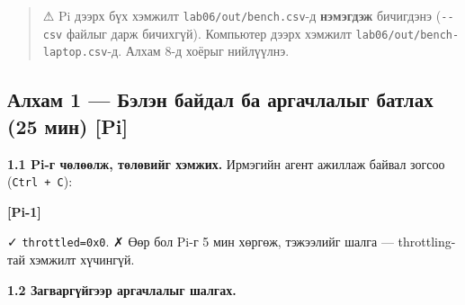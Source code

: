 \begin{quote}
⚠ Pi дээрх бүх хэмжилт \texttt{lab06/\allowbreak{}out/\allowbreak{}bench.\allowbreak{}csv}-д \textbf{нэмэгдэж} бичигдэнэ (\texttt{-\/-csv} файлыг дарж бичихгүй). Компьютер дээрх хэмжилт \texttt{lab06/\allowbreak{}out/\allowbreak{}bench-laptop.\allowbreak{}csv}-д. Алхам 8-д хоёрыг нийлүүлнэ.
\end{quote}

\hypertarget{ux430ux43bux445ux430ux43c-1-ux431ux44dux43bux44dux43d-ux431ux430ux439ux434ux430ux43b-ux431ux430-ux430ux440ux433ux430ux447ux43bux430ux43bux44bux433-ux431ux430ux442ux43bux430ux445-25-ux43cux438ux43d-pi}{%
\subsection{Алхам 1 --- Бэлэн байдал ба аргачлалыг батлах (25 мин) {[}Pi{]}}\label{ux430ux43bux445ux430ux43c-1-ux431ux44dux43bux44dux43d-ux431ux430ux439ux434ux430ux43b-ux431ux430-ux430ux440ux433ux430ux447ux43bux430ux43bux44bux433-ux431ux430ux442ux43bux430ux445-25-ux43cux438ux43d-pi}}

\textbf{1.1 Pi-г чөлөөлж, төлөвийг хэмжих.} Ирмэгийн агент ажиллаж байвал зогсоо (\texttt{Ctrl\ +\ C}):

\textbf{{[}Pi-1{]}}

\begin{Shaded}
\begin{Highlighting}[]
\KeywordTok{|} 
\end{Highlighting}
\end{Shaded}

✓ \texttt{throttled=0x0}. ✗ Өөр бол Pi-г 5 мин хөргөж, тэжээлийг шалга --- throttling-тай хэмжилт хүчингүй.

\textbf{1.2 Загваргүйгээр аргачлалыг шалгах.}

\begin{Shaded}
\begin{Highlighting}[]
 \KeywordTok{\textbackslash{}}
\end{Highlighting}
\end{Shaded}

